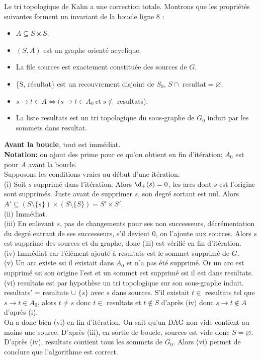 \documentclass[french, 11pt]{article}
\begin{document}
\begin{prop}{}{}
    Le tri topologique de Kahn a une correction totale.
    \tcblower
    Montrons que les propriétés suivantes forment un invariant de la boucle ligne 8 :
    \begin{itemize}
        \item[(i)] $A \subseteq S\times S$.
        \item[(ii)] $(S,A)$ est un graphe orienté acyclique.
        \item[(iii)] La file sources est exactement constituée des sources de $G$.
        \item[(iv)] \{S, résultat\} est un recouvrement disjoint de $S_0$, $S\cap$ resultat$=\varnothing$.
        \item[(v)] $s\to t\in A \iff (s\to t \in A_0 ~$et$~ s\notin$ resultats).
        \item[(vi)] La liste resultats est un tri topologique du sous-graphe de $G_0$ induit par les sommets dans resultat. 
    \end{itemize}
    \textbf{Avant la boucle}, tout est immédiat.\\
    \textbf{Notation:} on ajout des prime pour ce qu'on obtient en fin d'itération; $A_0$ est pour $A$ avant la boucle.\\
    Supposons les conditions vraies au début d'une itération.\\
    (i) Soit $s$ supprimé dans l'itération. Alors $\d_+(s)=0$, les arcs dont $s$ est l'origine sont supprimés. Juste avant de supprimer $s$, son degré sortant est nul. Alors $A'\subseteq(S\setminus\{s\})\times(S\setminus\{S\})=S'\times S'$.\\
    (ii) Immédiat.\\
    (iii) En enlevant $s$, pas de changements pour ses non successeurs, décrémentation du degré entrant de ses successeurs, s'il devient 0, on l'ajoute aux sources. Alors $s$ est supprimé des sources et du graphe, donc (iii) est vérifié en fin d'itération.\\
    (iv) Immédiat car l'élément ajouté à resultats est le sommet supprimé de $G$.\\
    (v) Un arc existe ssi il existait dans $A_0$ et n'a pas été supprimé. Or un arc est supprimé ssi son origine l'est et un sommet est supprimé ssi il est dans resultats.\\
    (vi) resultats est par hypothèse un tri topologique sur son sous-graphe induit. resultats' = resultats $\cup$ $\{s\}$ avec $s$ dans sources. S'il existait $t\in$ resultats tel que $s\to t\in A_0$, alors $t\neq s$ donc $t\in$ resultats et $t\notin S$ d'après (iv) donc $s\to t\notin A$ d'après (i).\\
    On a donc bien (vi) en fin d'itération. On sait qu'un DAG non vide contient au moins une source. D'après (iii), en sortie de boucle, sources est vide donc $S=\varnothing$. D'après (iv), resultats contient tous les sommets de $G_0$. Alors (vi) permet de conclure que l'algorithme est correct.
\end{prop}
\end{document}
